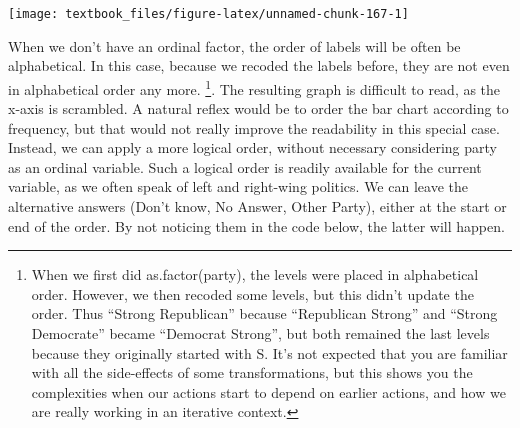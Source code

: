 \documentclass[]{tufte-book}
\newenvironment{Shaded}{}{}
\newcommand{\DataTypeTok}[1]{\textcolor[rgb]{0.56,0.13,0.00}{#1}}
\newcommand{\DecValTok}[1]{\textcolor[rgb]{0.25,0.63,0.44}{#1}}
\newcommand{\KeywordTok}[1]{\textcolor[rgb]{0.00,0.44,0.13}{\textbf{#1}}}
\newcommand{\NormalTok}[1]{#1}
\newcommand{\OperatorTok}[1]{\textcolor[rgb]{0.40,0.40,0.40}{#1}}
\newcommand{\StringTok}[1]{\textcolor[rgb]{0.25,0.44,0.63}{#1}}
\begin{document}
\begin{Shaded}
\end{Shaded}

\texttt{[image: textbook\_files/figure-latex/unnamed-chunk-167-1]}

When we don't have an ordinal factor, the order of labels will be often be alphabetical. In this case, because we recoded the labels before, they are not even in alphabetical order any more. \footnote{When we first did as.factor(party), the levels were placed in alphabetical order. However, we then recoded some levels, but this didn't update the order. Thus ``Strong Republican'' because ``Republican Strong'' and ``Strong Democrate'' became ``Democrat Strong'', but both remained the last levels because they originally started with S. It's not expected that you are familiar with all the side-effects of some transformations, but this shows you the complexities when our actions start to depend on earlier actions, and how we are really working in an iterative context.}. The resulting graph is difficult to read, as the x-axis is scrambled. A natural reflex would be to order the bar chart according to frequency, but that would not really improve the readability in this special case. Instead, we can apply a more logical order, without necessary considering party as an ordinal variable. Such a logical order is readily available for the current variable, as we often speak of left and right-wing politics. We can leave the alternative answers (Don't know, No Answer, Other Party), either at the start or end of the order. By not noticing them in the code below, the latter will happen.

\begin{Shaded}
\end{Shaded}
\end{document}
